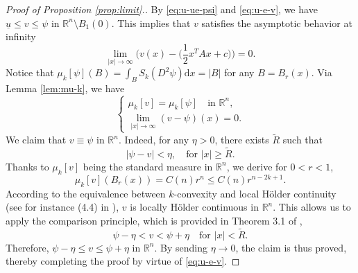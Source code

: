 \documentclass[reqno]{amsart}
\theoremstyle{remark}
\theoremstyle{definition}
\numberwithin{equation}{section}
\begin{document}
\begin{proof}[Proof of Proposition \ref{prop:limit}.]
	By \eqref{eq:u-ue-psi} and \eqref{eq:u-e-v}, we have $\underline{u}\leq v\leq \psi$ in $\mathbb{R}^n\setminus B_1(0)$.
This implies that $v$ satisfies the asymptotic behavior at infinity
$$\lim_{|x|\to\infty}\bigg(v(x)-\bigg(\frac{1}{2}x^TAx+c\bigg)\bigg)=0.$$ 
Notice that $\mu_k[\psi](B)=\int_{B}S_k(D^2\psi)\mathrm{d}x=|B|$ for any $B=B_r(x)$. Via Lemma \ref{lem:mu-k}, we have 
\begin{equation*}
	\begin{cases}
		\mu_k[v]=\mu_k[\psi]\quad\text{in }\mathbb{R}^n, \\
		\lim\limits_{|x|\to\infty}(v-\psi)(x)=0.
	\end{cases}
\end{equation*}
We claim that $v\equiv \psi$ in $\mathbb{R}^n$. Indeed, for any $\eta>0$, there exists $\tilde{R}$ such that 
$$|\psi-v|<\eta,\quad\text{for }|x|\geq\tilde{R}.$$
Thanks to $\mu_k[v]$ being the standard measure in $\mathbb{R}^n$, we derive for $0<r<1$, 
$$\mu_{k}[v](B_r(x))=C(n)r^n\leq C(n)r^{n-2k+1}.$$
According to the equivalence between $k$-convexity and local H\"{o}lder continuity (see for instance (4.4) in \cite{Trudinger-Wang-III}), $v$ is locally H\"{o}lder continuous in $\mathbb{R}^n$. This allows us to apply the comparison principle, which is provided in Theorem 3.1 of \cite{Trudinger-Wang-I},
$$\psi-\eta<v<\psi+\eta\quad\text{for }|x|<\tilde{R}.$$
Therefore, $\psi-\eta\leq v\leq\psi+\eta$ in $\mathbb{R}^n$. By sending $\eta\to0$, the claim is thus proved, thereby completing the proof by virtue of \eqref{eq:u-e-v}.
\end{proof}
\end{document}
